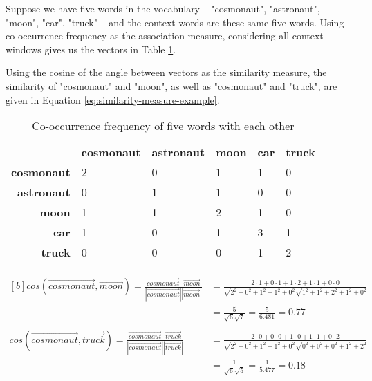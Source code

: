 \documentclass{article}
\begin{document}
Suppose we have five words in the vocabulary -- "cosmonaut", "astronaut", "moon", "car", "truck" -- and the context words are these same five words. Using co-occurrence frequency as the association measure, considering all context windows gives us the vectors in Table \ref{tab:similarity-measure-example}.

Using the cosine of the angle between vectors as the similarity measure, the similarity of "cosmonaut" and "moon", as well as "cosmonaut" and "truck", are given in Equation \ref{eq:similarity-measure-example}.

\begin{table}
	\centering
	\begin{tabular}{|r|l|l|l|l|l|}
		& \textbf{cosmonaut} & \textbf{astronaut} & \textbf{moon} & \textbf{car} & \textbf{truck} \\
		\textbf{cosmonaut} & 2 & 0 & 1 & 1 & 0 \\
		\textbf{astronaut} & 0 & 1 & 1 & 0 & 0 \\
		\textbf{moon} & 1 & 1 & 2 & 1 & 0 \\
		\textbf{car} & 1 & 0 & 1 & 3 & 1 \\
		\textbf{truck} & 0 & 0 & 0 & 1 & 2 \\								
	\end{tabular}
	\caption{Co-occurrence frequency of five words with each other}
	\label{tab:similarity-measure-example}
\end{table}

\begin{equation}
\begin{aligned}[b]
	cos(\vec{cosmonaut}, \vec{moon}) = 
	\frac{\vec{cosmonaut} \cdot \vec{moon}}{|\vec{cosmonaut}| |\vec{moon}|}
	&= \frac{2 \cdot 1 + 0 \cdot 1 + 1 \cdot 2 + 1 \cdot 1 + 0 \cdot 0}{ \sqrt{2^2 + 0^2 + 1^2 + 1^2 + 0^2} \sqrt{1^2 + 1^2 + 2^2 + 1^2 + 0^2} } \\
	&= \frac{5}{\sqrt{6}\sqrt{7}} = \frac{5}{6.481} = 0.77 \\
	\\
	cos(\vec{cosmonaut}, \vec{truck}) = 
	\frac{\vec{cosmonaut} \cdot \vec{truck}}{|\vec{cosmonaut}| |\vec{truck}|}
	&= \frac{2 \cdot 0 + 0 \cdot 0 + 1 \cdot 0 + 1 \cdot 1 + 0 \cdot 2}{ \sqrt{2^2 + 0^2 + 1^2 + 1^2 + 0^2} \sqrt{0^2 + 0^2 + 0^2 + 1^2 + 2^2} } \\
	&= \frac{1}{\sqrt{6}\sqrt{5}} = \frac{1}{5.477} = 0.18 \\
	\label{eq:similarity-measure-example}
\end{aligned}
\end{equation}
\end{document}
